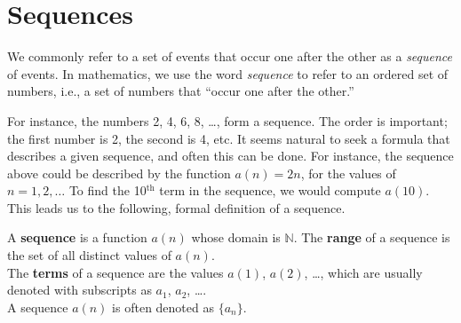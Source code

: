 

\section{Sequences}\label{sec:sequences}

We commonly refer to a set of events that occur one after the other as a \textit{sequence} of events. In mathematics, we use the word \textit{sequence} to refer to an ordered set of numbers, i.e., a set of numbers that ``occur one after the other.''

For instance, the numbers 2, 4, 6, 8, \ldots, form a sequence. The order is important; the first number is 2, the second is 4, etc. It seems natural to seek a formula that describes a given sequence, and often this can be done. For instance, the sequence above could be described by the function $a(n) = 2n$, for the values of $n = 1, 2, \ldots$ To find the 10$^\text{th}$ term in the sequence, we would compute $a(10)$. This leads us to the following, formal definition of a sequence.

{A \textbf{sequence} is a function $a(n)$ whose domain is $\mathbb{N}$. The \textbf{range} of a sequence is the set of all distinct values of $a(n)$.\\

The \textbf{terms} of a sequence are the values $a(1)$, $a(2)$, \ldots, which are usually denoted with subscripts as $a_1$, $a_2$, \ldots.\\

A sequence $a(n)$ is often denoted as $\{a_n\}$.}



